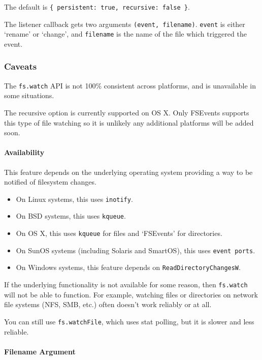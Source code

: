 The default is \texttt{\{\ persistent:\ true,\ recursive:\ false\ \}}.

The listener callback gets two arguments \texttt{(event,\ filename)}.
\texttt{event} is either `rename' or `change', and \texttt{filename} is
the name of the file which triggered the event.

\subsubsection{Caveats}\label{caveats}

The \texttt{fs.watch} API is not 100\% consistent across platforms, and
is unavailable in some situations.

The recursive option is currently supported on OS X. Only FSEvents
supports this type of file watching so it is unlikely any additional
platforms will be added soon.

\paragraph{Availability}\label{availability}

This feature depends on the underlying operating system providing a way
to be notified of filesystem changes.

\begin{itemize}
\itemsep1pt\parskip0pt
\item
  On Linux systems, this uses \texttt{inotify}.
\item
  On BSD systems, this uses \texttt{kqueue}.
\item
  On OS X, this uses \texttt{kqueue} for files and `FSEvents' for
  directories.
\item
  On SunOS systems (including Solaris and SmartOS), this uses
  \texttt{event\ ports}.
\item
  On Windows systems, this feature depends on
  \texttt{ReadDirectoryChangesW}.
\end{itemize}

If the underlying functionality is not available for some reason, then
\texttt{fs.watch} will not be able to function. For example, watching
files or directories on network file systems (NFS, SMB, etc.) often
doesn't work reliably or at all.

You can still use \texttt{fs.watchFile}, which uses stat polling, but it
is slower and less reliable.

\paragraph{Filename Argument}\label{filename-argument}

